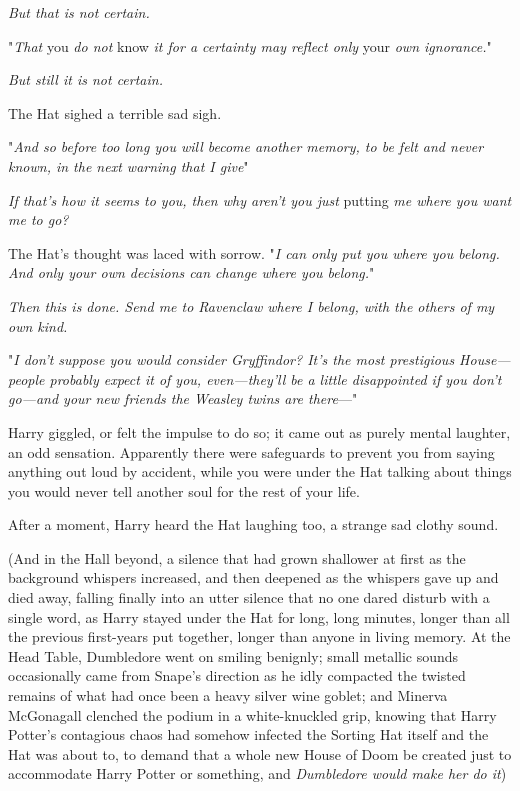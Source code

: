 \emph{But that is not certain.}

"\emph{That} you \emph{do not} know \emph{it for a certainty may reflect only}
your \emph{own ignorance.}"

\emph{But still it is not certain.}

The Hat sighed a terrible sad sigh.

"\emph{And so before too long you will become another memory, to be felt and
never known, in the next warning that I give{\el}}"

\emph{If that's how it seems to you, then why aren't you just} putting \emph{me
where you want me to go?}

The Hat's thought was laced with sorrow. "\emph{I can only put you where you
belong. And only your own decisions can change where you belong.}"

\emph{Then this is done. Send me to Ravenclaw where I belong, with the others
of my own kind.}

"\emph{I don't suppose you would consider Gryffindor? It's the most prestigious
House---people probably expect it of you, even---they'll be a little
disappointed if you don't go---and your new friends the Weasley twins are
there}\mbox{---}"

Harry giggled, or felt the impulse to do so; it came out as purely mental
laughter, an odd sensation. Apparently there were safeguards to prevent you
from saying anything out loud by accident, while you were under the Hat talking
about things you would never tell another soul for the rest of your life.

After a moment, Harry heard the Hat laughing too, a strange sad clothy sound.

(And in the Hall beyond, a silence that had grown shallower at first as the
background whispers increased, and then deepened as the whispers gave up and
died away, falling finally into an utter silence that no one dared disturb with
a single word, as Harry stayed under the Hat for long, long minutes, longer
than all the previous first-years put together, longer than anyone in living
memory. At the Head Table, Dumbledore went on smiling benignly; small metallic
sounds occasionally came from Snape's direction as he idly compacted the
twisted remains of what had once been a heavy silver wine goblet; and Minerva
McGonagall clenched the podium in a white-knuckled grip, knowing that Harry
Potter's contagious chaos had somehow infected the Sorting Hat itself and the
Hat was about to, to demand that a whole new House of Doom be created just to
accommodate Harry Potter or something, and \emph{Dumbledore would make her do
it}{\el})

